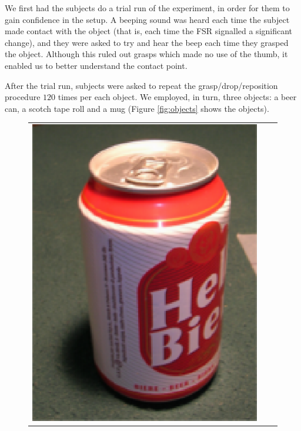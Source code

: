 We first had the subjects do a trial run of the experiment, in order
for them to gain confidence in the setup. A beeping sound was heard
each time the subject made contact with the object (that is, each time
the FSR signalled a significant change), and they were asked to try
and hear the beep each time they grasped the object. Although this
ruled out grasps which made no use of the thumb, it enabled us to
better understand the contact point.

After the trial run, subjects were asked to repeat the
grasp/drop/reposition procedure $120$ times per each object. We
employed, in turn, three objects: a beer can, a scotch tape roll and a
mug (Figure \ref{fig:objects} shows the objects).

\begin{figure}[htbp]
  \begin{center}
    \begin{tabular}{ccc}
      \includegraphics[height=0.2\textheight]{beer.eps} &

\end{tabular}
\end{center}
\end{figure}
